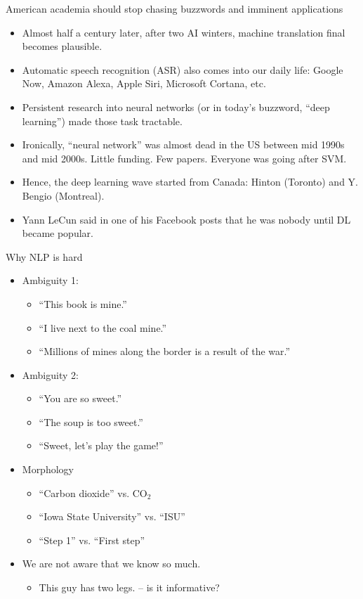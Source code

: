 \documentclass[11pt,handout]{beamer}
\begin{document}
\begin{frame}{American academia should stop chasing buzzwords and imminent applications}
 \begin{itemize}[<+->]  
   \item Almost half a century later, after two AI winters, machine translation final becomes plausible. 
   \item Automatic speech recognition (ASR) also comes into our daily life: Google Now, Amazon Alexa, Apple Siri, Microsoft Cortana, etc. 
   \item Persistent research into neural networks (or in today's buzzword, ``deep learning'') made those task tractable. 
   \item Ironically, ``neural network'' was almost dead in the US between mid 1990s and mid 2000s. Little funding. Few papers. Everyone was going after SVM.
   \item Hence, the deep learning wave started from Canada: Hinton (Toronto) and Y. Bengio (Montreal).
   \item Yann LeCun said in one of his Facebook posts that he was nobody until DL became popular. 
\end{itemize}
\end{frame}

\begin{frame}{Why NLP is hard}
\begin{itemize}[<+->]
 \item Ambiguity 1: \begin{itemize}
                   \item ``This book is mine.''
                   \item ``I live next to the coal mine.''
                   \item ``Millions of mines along the border is a result of the war.''
                  \end{itemize}
 \item Ambiguity 2: \begin{itemize}
                   \item ``You are so sweet.''
                   \item ``The soup is too sweet.''
                   \item ``Sweet, let's play the game!''
                  \end{itemize}
 \item Morphology 
 \begin{itemize}
  \item ``Carbon dioxide'' vs. CO$_2$
  \item ``Iowa State University'' vs. ``ISU''
  \item ``Step 1'' vs. ``First step'' 
 \end{itemize}
 \item We are not aware that we know so much. 
 \begin{itemize}
  \item This guy has two legs.  -- is it informative?
 \end{itemize}
\end{itemize}
\end{frame}
\end{document}
